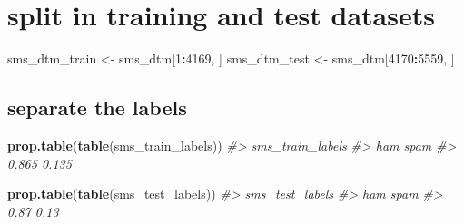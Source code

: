 \documentclass[]{book}
\newenvironment{Shaded}{\begin{snugshade}}{\end{snugshade}}
\newcommand{\CommentTok}[1]{\textcolor[rgb]{0.56,0.35,0.01}{\textit{#1}}}
\newcommand{\DecValTok}[1]{\textcolor[rgb]{0.00,0.00,0.81}{#1}}
\newcommand{\KeywordTok}[1]{\textcolor[rgb]{0.13,0.29,0.53}{\textbf{#1}}}
\newcommand{\NormalTok}[1]{#1}
\newcommand{\OperatorTok}[1]{\textcolor[rgb]{0.81,0.36,0.00}{\textbf{#1}}}
\newcommand{\StringTok}[1]{\textcolor[rgb]{0.31,0.60,0.02}{#1}}
\begin{document}
\hypertarget{split-in-training-and-test-datasets}{%
\section{split in training and test datasets}\label{split-in-training-and-test-datasets}}

\begin{Shaded}
\begin{Highlighting}[]
\NormalTok{sms_dtm_train <-}\StringTok{ }\NormalTok{sms_dtm[}\DecValTok{1}\OperatorTok{:}\DecValTok{4169}\NormalTok{, ]}
\NormalTok{sms_dtm_test  <-}\StringTok{ }\NormalTok{sms_dtm[}\DecValTok{4170}\OperatorTok{:}\DecValTok{5559}\NormalTok{, ]}
\end{Highlighting}
\end{Shaded}

\hypertarget{separate-the-labels}{%
\subsection{separate the labels}\label{separate-the-labels}}

\begin{Shaded}
\end{Shaded}

\begin{Shaded}
\begin{Highlighting}[]
\KeywordTok{prop.table}\NormalTok{(}\KeywordTok{table}\NormalTok{(sms_train_labels))}
\CommentTok{#> sms_train_labels}
\CommentTok{#>   ham  spam }
\CommentTok{#> 0.865 0.135}
\end{Highlighting}
\end{Shaded}

\begin{Shaded}
\begin{Highlighting}[]
\KeywordTok{prop.table}\NormalTok{(}\KeywordTok{table}\NormalTok{(sms_test_labels))}
\CommentTok{#> sms_test_labels}
\CommentTok{#>  ham spam }
\CommentTok{#> 0.87 0.13}
\end{Highlighting}
\end{Shaded}
\end{document}
